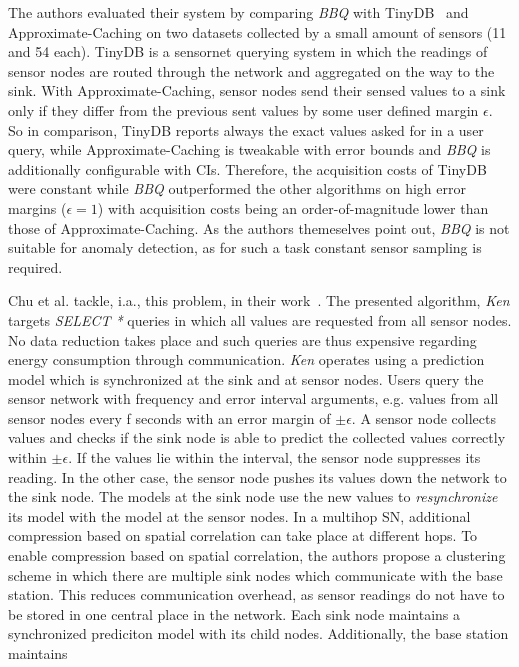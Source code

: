 The authors evaluated their system by comparing \textit{BBQ} with
TinyDB~\cite{madden2005tinydb} and Approximate-Caching on two datasets
collected by a small amount of sensors (11 and 54 each). TinyDB is a sensornet
querying system in which the readings of sensor nodes are routed through the
network and aggregated on the way to the sink. With Approximate-Caching, sensor
nodes send their sensed values to a sink only if they differ from the previous
sent values by some user defined margin $ \epsilon $. So in comparison, TinyDB
reports always the exact values asked for in a user query, while
Approximate-Caching is tweakable with error bounds and \textit{BBQ} is
additionally configurable with \acp{CI}. Therefore, the acquisition costs of
TinyDB were constant while \textit{BBQ} outperformed the other algorithms on
high error margins ($ \epsilon = 1 $) with acquisition costs being an
order-of-magnitude lower than those of Approximate-Caching. As the authors
themeselves point out, \textit{BBQ} is not suitable for anomaly detection, as
for such a task constant sensor sampling is required.
\par
Chu et al. tackle, i.a., this problem, in their work~\cite{chu2006approximate}.
The presented algorithm, \textit{Ken} targets \textit{SELECT *} queries in
which all values are requested from all sensor nodes. No data reduction takes
place and such queries are thus expensive regarding energy consumption through
communication. \textit{Ken} operates using a prediction model which is
synchronized at the sink and at sensor nodes. Users query the sensor network
with frequency and error interval arguments, e.g. values from all sensor nodes
every f seconds with an error margin of $ \pm\epsilon $. A sensor node collects
values and checks if the sink node is able to predict the collected values
correctly within $ \pm\epsilon $. If the values lie within the interval, the
sensor node suppresses its reading. In the other case, the sensor node pushes
its values down the network to the sink node. The models at the sink node use
the new values to \textit{resynchronize} its model with the model at the sensor
nodes. In a multihop \ac{SN}, additional compression based on spatial
correlation can take place at different hops. To enable compression based on
spatial correlation, the authors propose a clustering scheme in which there are
multiple sink nodes which communicate with the base station. This reduces
communication overhead, as sensor readings do not have to be stored in one
central place in the network. Each sink node maintains a synchronized
prediciton model with its child nodes. Additionally, the base station maintains
